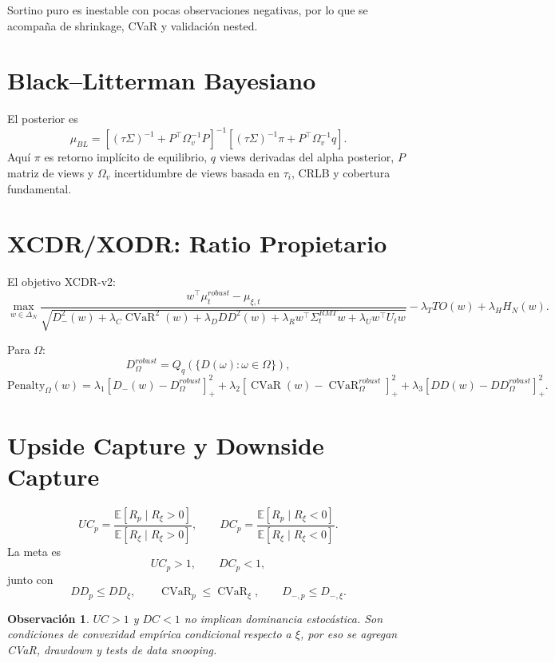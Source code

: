 \documentclass[11pt,letterpaper]{article}
\newtheorem{remark}{Observación}
\DeclareMathOperator{\CVaR}{CVaR}
\newcommand{\E}{\mathbb{E}}
\newcommand{\1}{\mathbbm{1}}
\begin{document}
Sortino puro es inestable con pocas observaciones negativas, por lo que se acompaña de shrinkage, CVaR y validación nested.

\section{Black--Litterman Bayesiano}

El posterior es
\[
\mu_{BL}
=
\left[
(\tau\Sigma)^{-1}
+P^\top\Omega_v^{-1}P
\right]^{-1}
\left[
(\tau\Sigma)^{-1}\pi
+P^\top\Omega_v^{-1}q
\right].
\]
Aquí \(\pi\) es retorno implícito de equilibrio, \(q\) views derivadas del alpha posterior, \(P\) matriz de views y \(\Omega_v\) incertidumbre de views basada en \(\tau_i\), CRLB y cobertura fundamental.

\section{XCDR/XODR: Ratio Propietario}

El objetivo XCDR-v2:
\[
\max_{w\in\Delta_N}
\frac{
w^\top\mu^{robust}_t-\mu_{\xi,t}
}{
\sqrt{
D_-^2(w)
+\lambda_C\CVaR^2(w)
+\lambda_DDD^2(w)
+\lambda_R w^\top\Sigma_t^{RMT}w
+\lambda_U w^\top U_t w
}}
-\lambda_TTO(w)+\lambda_HH_N(w).
\]

Para \(\Omega\):
\[
D_\Omega^{robust}
=
Q_q(\{D(\omega):\omega\in\Omega\}),
\]
\[
\mathrm{Penalty}_\Omega(w)
=
\lambda_1[D_-(w)-D_\Omega^{robust}]_+^2
+\lambda_2[\CVaR(w)-\CVaR_\Omega^{robust}]_+^2
+\lambda_3[DD(w)-DD_\Omega^{robust}]_+^2.
\]

\section{Upside Capture y Downside Capture}

\[
UC_p
=
\frac{\E[R_p\mid R_\xi>0]}
{\E[R_\xi\mid R_\xi>0]},
\qquad
DC_p
=
\frac{\E[R_p\mid R_\xi<0]}
{\E[R_\xi\mid R_\xi<0]}.
\]
La meta es
\[
UC_p>1,\qquad DC_p<1,
\]
junto con
\[
DD_p\le DD_\xi,\qquad
\CVaR_p\le\CVaR_\xi,\qquad
D_{-,p}\le D_{-,\xi}.
\]

\begin{remark}
\(UC>1\) y \(DC<1\) no implican dominancia estocástica. Son condiciones de convexidad empírica condicional respecto a \(\xi\), por eso se agregan CVaR, drawdown y tests de data snooping.
\end{remark}
\end{document}
